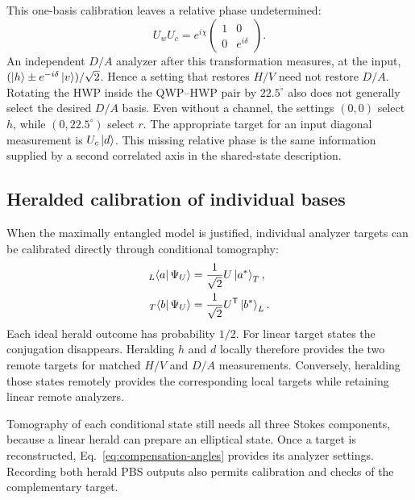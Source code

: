 \documentclass[a4paper,10pt]{article}
\begin{document}
This one-basis calibration leaves a relative phase undetermined:
\begin{equation}
    U_wU_c=e^{i\chi}
    \begin{pmatrix}1&0\\0&e^{i\delta}\end{pmatrix}.
    \label{eq:residual-phase}
\end{equation}
An independent $D/A$ analyzer after this transformation measures,
at the input, $(\ket h\pm e^{-i\delta}\ket v)/\sqrt2$. Hence a setting
that restores $H/V$ need not restore $D/A$.
Rotating the HWP inside the QWP--HWP pair by $22.5^\circ$ also does
not generally select the desired $D/A$ basis. Even without a channel,
the settings $(0,0)$ select $h$, while $(0,22.5^\circ)$ select $r$.
The appropriate target for an input diagonal measurement is $U_c\ket d$.
This missing relative phase is the same information supplied by a
second correlated axis in the shared-state description.

\subsection{Heralded calibration of individual bases}

When the maximally entangled model is justified, individual analyzer
targets can be calibrated directly through conditional tomography:
\begin{equation}
    \begin{aligned}
        {}_L\!\bra a\Psi_U\rangle
            &=\frac{1}{\sqrt2}U\ket{a^*}_T,\\
        {}_T\!\bra b\Psi_U\rangle
            &=\frac{1}{\sqrt2}U^{\mathsf T}\ket{b^*}_L.
    \end{aligned}
    \label{eq:heralded-targets}
\end{equation}
Each ideal herald outcome has probability $1/2$. For linear target states
the conjugation disappears. Heralding $h$ and $d$ locally therefore
provides the two remote targets for matched $H/V$ and $D/A$ measurements.
Conversely, heralding those states remotely provides the corresponding
local targets while retaining linear remote analyzers.

Tomography of each conditional state still needs all three Stokes
components, because a linear herald can prepare an elliptical state.
Once a target is reconstructed, Eq.~\eqref{eq:compensation-angles}
provides its analyzer settings. Recording both herald PBS outputs
also permits calibration and checks of the complementary target.
\end{document}
